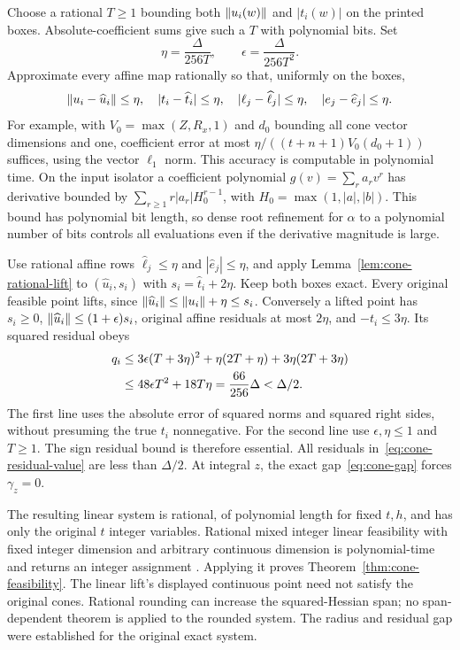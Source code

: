 Choose a rational $T\ge1$ bounding both $\left\lVert u_i(w)\right\rVert$ and
$|t_i(w)|$ on the printed boxes. Absolute-coefficient sums give such
a $T$ with polynomial bits. Set
\begin{equation}
\label{eq:cone-tolerances}
 \eta=\frac{\Delta}{256T},\qquad
 \epsilon=\frac{\Delta}{256T^2}.
\end{equation}
Approximate every affine map rationally so that, uniformly on the boxes,
\[
 \left\lVert u_i-\widehat u_i\right\rVert\le\eta,\quad
 |t_i-\widehat t_i|\le\eta,\quad
 |\ell_j-\widehat\ell_j|\le\eta,\quad
 |e_j-\widehat e_j|\le\eta.
\]
For example, with $V_0=\max(Z,R_x,1)$ and $d_0$ bounding all cone
vector dimensions and one, coefficient error at most
$\eta/((t+n+1)V_0(d_0+1))$ suffices, using the vector $\ell_1$ norm.
This accuracy is computable in polynomial time. On the input isolator a
coefficient polynomial $g(v)=\sum_ra_rv^r$ has derivative bounded by
$\sum_{r\ge1}r|a_r|H_0^{r-1}$, with
$H_0=\max(1,|a|,|b|)$. This bound has polynomial bit length, so dense
root refinement for $\alpha$ to a polynomial number of bits controls
all evaluations even if the derivative magnitude is large.

Use rational affine rows $\widehat\ell_j\le\eta$ and
$|\widehat e_j|\le\eta$, and apply Lemma~\ref{lem:cone-rational-lift}
to $(\widehat u_i,s_i)$ with $s_i=\widehat t_i+2\eta$. Keep both
boxes exact. Every original feasible point lifts, since
$\left\lVert\widehat u_i\right\rVert\le\left\lVert u_i\right\rVert+\eta\le s_i$.
Conversely a lifted point has $s_i\ge0$,
$\left\lVert\widehat u_i\right\rVert\le(1+\epsilon)s_i$, original affine residuals
at most $2\eta$, and $-t_i\le3\eta$. Its squared residual obeys
\begin{align}
\label{eq:cone-rounding-error}
 q_i&\le3\epsilon(T+3\eta)^2+
                 \eta(2T+\eta)+3\eta(2T+3\eta)\notag\\
    &\le48\epsilon T^2+18T\eta
       =\frac{66}{256}\Delta<\Delta/2.
\end{align}
The first line uses the absolute error of squared norms and squared right
sides, without presuming the true $t_i$ nonnegative. For the second line
use $\epsilon,\eta\le1$ and $T\ge1$. The sign residual bound is
therefore essential. All residuals in~\eqref{eq:cone-residual-value}
are less than $\Delta/2$. At integral $z$, the exact
gap~\eqref{eq:cone-gap} forces $\gamma_z=0$.

The resulting linear system is rational, of polynomial length for fixed
$t,h$, and has only the original $t$ integer variables. Rational mixed
integer linear feasibility with fixed integer dimension and arbitrary
continuous dimension is polynomial-time and returns an integer assignment
\cite[Section~5]{Lenstra1983}. Applying it proves
Theorem~\ref{thm:cone-feasibility}. The linear lift's displayed continuous
point need not satisfy the original cones. Rational rounding can increase
the squared-Hessian span; no span-dependent theorem is applied to the
rounded system. The radius and residual gap were established for the
original exact system.

